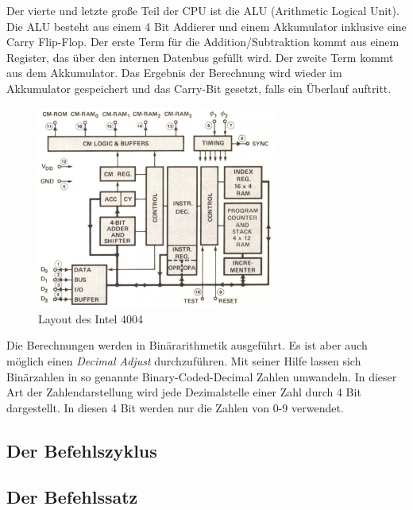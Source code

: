 Der vierte und letzte große Teil der CPU ist die ALU (Arithmetic Logical Unit). Die ALU besteht aus einem 4 Bit Addierer und einem Akkumulator inklusive eine Carry Flip-Flop. Der erste Term für die Addition/Subtraktion kommt aus einem Register, das über den internen Datenbus gefüllt wird. Der zweite Term kommt aus dem Akkumulator. Das Ergebnis der Berechnung wird wieder im Akkumulator gespeichert und das Carry-Bit gesetzt, falls ein Überlauf auftritt.
 \begin{figure}[h]
 	\centering
 	\includegraphics[width=0.7\textwidth]{figures/layout_4004.png}
 	\caption{Layout des Intel 4004}
 	\label{fig:layout_4004}
 \end{figure}
Die Berechnungen werden in Binärarithmetik ausgeführt. Es ist aber auch möglich einen \textit{Decimal Adjust} durchzuführen. Mit seiner Hilfe lassen sich Binärzahlen in so genannte Binary-Coded-Decimal Zahlen umwandeln. In dieser Art der Zahlendarstellung wird jede Dezimalstelle einer Zahl durch 4 Bit dargestellt. In diesen 4 Bit werden nur die Zahlen von 0-9 verwendet.

\subsection{Der Befehlszyklus}
\label{ch:befehlszyklus}

\subsection{Der Befehlssatz}